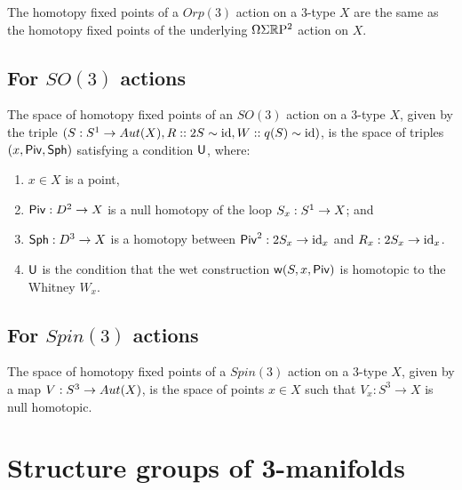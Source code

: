 \documentclass{amsart}
\begin{document}
\begin{proposition} 
\label{prop-quadvs2fp}
The homotopy fixed points of a $Orp(3)$ action on a 3-type $X$ are the same as the homotopy fixed points of the underlying $\Omega \Sigma \mathbb R \mathrm{P}^2$ action on $X$.
\end{proposition}



\subsection{For $SO(3)$ actions}

\begin{theorem}
The space of homotopy fixed points of an $SO(3)$ action on a 3-type $X$, given by the triple $(S: S^1 \rightarrow Aut(X),R:: 2 S \sim \mathrm{id},W:: q(S) \sim \mathrm{id})$, is the space of triples $(x, \mathsf{Piv}, \mathsf{Sph})$ satisfying a condition $\mathsf{U}$, where:
\begin{enumerate}
\item $x \in X$ is a point,
\item $\mathsf{Piv}: D^2 \rightarrow X$ is a null homotopy of the loop $S_x: S^1 \rightarrow X$; and
\item $\mathsf{Sph}: D^3 \rightarrow X$ is a homotopy between $\mathsf{Piv}^2 : 2 S_x \rightarrow \mathrm{id}_x$ and $R_x: 2 S_x \rightarrow \mathrm{id}_x$.
\item $\mathsf{U}$ is the condition that the wet construction $\mathsf{w}(S,x,\mathsf{Piv})$ is homotopic to the Whitney $W_x$.
\end{enumerate}
\end{theorem}

\subsection{For $Spin(3)$ actions} 

\begin{proposition}
The space of homotopy fixed points of a $Spin(3)$ action on a 3-type $X$, given by a map $V: S^3 \rightarrow Aut(X)$, is the space of points $x \in X$ such that $V_x : S^3 \to X$ is null homotopic.
\end{proposition}




\appendix
\renewcommand{\thetheorem}{A.\arabic{theorem}}
\setcounter{theorem}{0}


\section{Structure groups of 3-manifolds} \label{sec-lft-struc}
\end{document}

